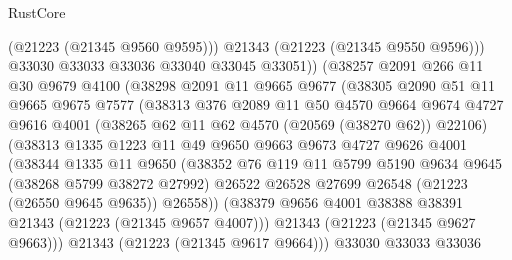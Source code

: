 \begin{lexlean}{RustCore}
\begin{coremodule}
                        (@21223 (@21345 @9560 @9595)))
                      @21343
                      (@21223 (@21345 @9550 @9596)))
                    @33030
                    @33033
                    @33036
                    @33040
                    @33045
                    @33051))
                (@38257
                  @2091
                  @266
                  @11
                  @30
                  @9679
                  @4100
                  (@38298
                    @2091
                    @11
                    @9665
                    @9677
                    (@38305
                      @2090
                      @51
                      @11
                      @9665
                      @9675
                      @7577
                      (@38313
                        @376
                        @2089
                        @11
                        @50
                        @4570
                        @9664
                        @9674
                        @4727
                        @9616
                        @4001
                        (@38265 @62 @11 @62 @4570 (@20569 (@38270 @62)) @22106)
                        (@38313
                          @1335
                          @1223
                          @11
                          @49
                          @9650
                          @9663
                          @9673
                          @4727
                          @9626
                          @4001
                          (@38344
                            @1335
                            @11
                            @9650
                            (@38352
                              @76
                              @119
                              @11
                              @5799
                              @5190
                              @9634
                              @9645
                              (@38268 @5799 @38272 @27992)
                              @26522
                              @26528
                              @27699
                              @26548
                              (@21223 (@26550 @9645 @9635))
                              @26558))
                          (@38379 @9656 @4001 @38388 @38391 @21343 (@21223 (@21345 @9657 @4007)))
                          @21343
                          (@21223 (@21345 @9627 @9663)))
                        @21343
                        (@21223 (@21345 @9617 @9664)))
                      @33030
                      @33033
                      @33036

\end{coremodule}
\end{lexlean}

